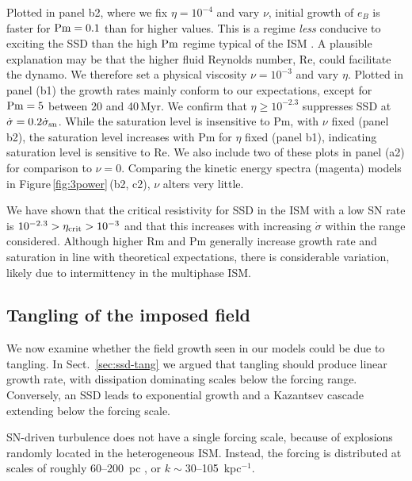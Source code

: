 \documentclass[preprint2]{aastex63}
\newcommand\Pm{{\rm Pm} }
\newcommand\SNr{\dot\sigma_{\rm sn}}
\begin{document}
 {Plotted in panel b2, where we fix $\eta=10^{-4}$ and vary $\nu$,
 initial growth of $e_B$ is faster for 
 $\Pm=0.1$ than for higher values.}
 This is a regime {\em less} conducive to exciting the SSD than the high $\Pm$
 regime typical of the ISM \citep{HBD04}.
 {A plausible explanation may be that the higher fluid Reynolds number, Re,
 could facilitate the dynamo.
 We therefore set a physical viscosity $\nu=10^{-3}$ and vary $\eta$. 
 Plotted in panel (b1) the growth rates mainly
 conform to our expectations, except for $\Pm=5$ between 20 and 40\,Myr.
 We confirm that $\eta\geq10^{-2.3}$ suppresses SSD at $\dot\sigma=0.2\SNr$.
 While the saturation level is insensitive to Pm, with $\nu$ fixed (panel
 b2), the saturation level increases with Pm for $\eta$ fixed (panel b1),
 indicating saturation level is sensitive to Re.
 We also include two of these plots in panel (a2) for comparison to $\nu=0$.
 Comparing the kinetic energy spectra (magenta) models in 
 Figure\,\ref{fig:3power}\,(b2, c2), $\nu$ alters very little.}
 
 {We have shown that the critical resistivity for SSD in the ISM with a
 low SN rate is $10^{-2.3}>\eta_{\rm crit}>10^{-3}$ and
 that this increases with increasing
 $\dot\sigma$ within the range considered.
 Although higher Rm and Pm generally increase growth rate
 and saturation
 in line with theoretical expectations,
 there is considerable variation, likely due to intermittency in
   the multiphase ISM.}
 
 
\subsection{{Tangling of the imposed field}} \label{sec:Balsara}

{We now examine whether the field growth seen in our models could
  be due to tangling.
  In Sect.~\ref{sec:ssd-tang} we argued that tangling should produce linear
  growth rate, with dissipation dominating scales below the forcing range.
  Conversely, an SSD leads to exponential growth and a Kazantsev cascade
  extending below the forcing scale.}

 SN-driven turbulence does not have a {single} forcing scale, 
 because of {explosions randomly located in} the heterogeneous ISM.
 {Instead, the} forcing {is} distributed at scales {of roughly 
 60--200~pc
   \citep{joung2006,avillez2007,HSSFG17}, or $k \sim 30$--105~kpc$^{-1}$}.
\end{document}

